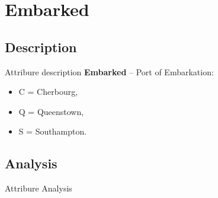 \section{Embarked} \label{section:Embarked}
\subsection{Description}
Attribure description
\textbf{Embarked} -- Port of Embarkation:
\begin{itemize}
    \item C = Cherbourg,
    \item Q = Queenstown,
    \item S = Southampton.
\end{itemize}

\subsection{Analysis}
Attribure Analysis